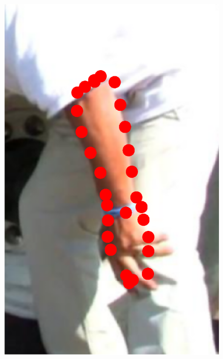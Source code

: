 \begin{figure}
    \includegraphics[height=\ofh]{resources/Annotation_Correction/Suplementory_Meterial/ExFit/0012.eps}
    \hfill

\end{figure}

